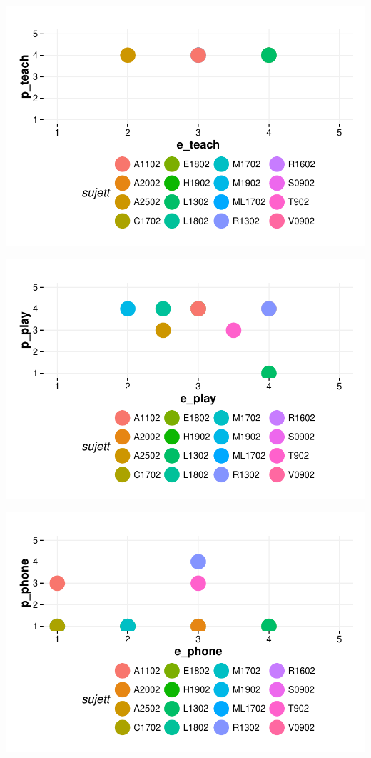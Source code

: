 \documentclass{article}
\begin{document}
\includegraphics{interviews/interviews-plot_coirs_parent_enfant_teach}

\includegraphics{interviews/interviews-plot_coirs_parent_enfant_play}

\includegraphics{interviews/interviews-plot_coirs_parent_enfant_phone}
\end{document}
